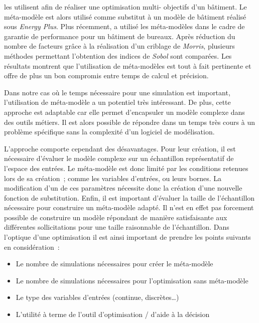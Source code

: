 \textcite{Armand-Decker2015} les utilisent afin de réaliser une optimisation multi-
objectifs d’un bâtiment. Le méta-modèle est alors utilisé comme substitut à un modèle de
bâtiment réalisé sous \textit{Energy Plus}.
Plus récemment, \textcite{Faggianelli201761} a utilisé les méta-modèles dans le cadre de garantie de
performance pour un bâtiment de bureaux. Après réduction du nombre de facteurs grâce à la
réalisation d’un criblage de \textit{Morris}, plusieurs méthodes permettant l’obtention
des indices de \textit{Sobol} sont comparées. Les résultats montrent que l’utilisation de
méta-modèles est tout à fait pertinente et offre de plus un bon compromis entre temps de calcul
et précision.

Dans notre cas où le temps nécessaire pour une simulation est important, l’utilisation de
méta-modèle a un potentiel très intéressant. De plus, cette approche est adaptable car elle
permet d’encapsuler un modèle complexe dans des outils métiers. Il est alors possible de
répondre dans un temps très cours à un problème spécifique sans la complexité d’un
logiciel de modélisation.

L’approche comporte cependant des désavantages. Pour leur création, il est nécessaire
d’évaluer le modèle complexe sur un échantillon représentatif de l’espace des entrées.
Le méta-modèle est donc limité par les conditions retenues lors de sa création~; comme
les variables d’entrées, ou leurs bornes. La modification d’un de ces paramètres nécessite
donc la création d’une nouvelle fonction de substitution.
Enfin, il est important d’évaluer la taille de l’échantillon nécessaire pour construire
un méta-modèle adapté. Il n’est en effet pas forcement possible de construire un modèle
répondant de manière satisfaisante aux différentes sollicitations pour une taille raisonnable
de l’échantillon.
Dans l’optique d’une optimisation il est ainsi important de prendre les points
suivants en considération~:
\begin{itemize}
  \item Le nombre de simulations nécessaires pour créer le méta-modèle
  \item Le nombre de simulations nécessaires pour l’optimisation sans méta-modèle
  \item Le type des variables d’entrées (continue, discrètes\dots)
  \item L’utilité à terme de l’outil d’optimisation / d’aide à la décision
\end{itemize}


